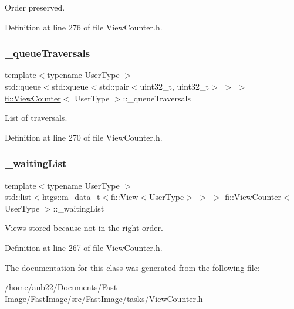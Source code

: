 Order preserved. 



Definition at line 276 of file View\+Counter.\+h.

\mbox{\label{classfi_1_1ViewCounter_a1f03f92f9e6d2c0db314faa1b70459b2}} 
\subsubsection{\texorpdfstring{\+\_\+queue\+Traversals}{\_queueTraversals}}
{\footnotesize\ttfamily template$<$typename User\+Type $>$ \\
std\+::queue$<$std\+::queue$<$std\+::pair$<$uint32\+\_\+t, uint32\+\_\+t$>$ $>$ $>$ \hyperlink{classfi_1_1ViewCounter}{fi\+::\+View\+Counter}$<$ User\+Type $>$\+::\+\_\+queue\+Traversals\hspace{0.3cm}{\ttfamily [private]}}



List of traversals. 



Definition at line 270 of file View\+Counter.\+h.

\mbox{\label{classfi_1_1ViewCounter_af3ee501d1562ebca98353a4dd68ea3c5}} 
\subsubsection{\texorpdfstring{\+\_\+waiting\+List}{\_waitingList}}
{\footnotesize\ttfamily template$<$typename User\+Type $>$ \\
std\+::list$<$htgs\+::m\+\_\+data\+\_\+t$<$\hyperlink{classfi_1_1View}{fi\+::\+View}$<$User\+Type$>$ $>$ $>$ \hyperlink{classfi_1_1ViewCounter}{fi\+::\+View\+Counter}$<$ User\+Type $>$\+::\+\_\+waiting\+List\hspace{0.3cm}{\ttfamily [private]}}



Views stored because not in the right order. 



Definition at line 267 of file View\+Counter.\+h.



The documentation for this class was generated from the following file\+:\begin{DoxyCompactItemize}
\item 
/home/anb22/\+Documents/\+Fast-\/\+Image/\+Fast\+Image/src/\+Fast\+Image/tasks/\hyperlink{ViewCounter_8h}{View\+Counter.\+h}\end{DoxyCompactItemize}
